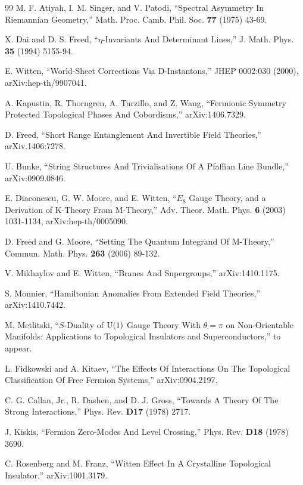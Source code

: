 \begin{thebibliography}{99}
M. F. Atiyah, I. M. Singer, and V. Patodi, ``Spectral Asymmetry In Riemannian Geometry,'' Math. Proc. Camb. Phil. Soc. {\bf{77} } (1975) 43-69.

X. Dai and D. S. Freed, ``$\eta$-Invariants And Determinant Lines,'' J. Math. Phys. {\bf 35} (1994) 5155-94.

E. Witten, ``World-Sheet Corrections Via D-Instantons,'' JHEP 0002:030 (2000), arXiv:hep-th/9907041.

A. Kapustin, R. Thorngren, A. Turzillo, and Z. Wang, ``Fermionic Symmetry Protected Topological Phases And Cobordisms,''
arXiv:1406.7329.

D. Freed, ``Short Range Entanglement And Invertible Field Theories,'' arXiv.1406:7278.

U. Bunke, ``String Structures And Trivialisations Of A Pfaffian Line Bundle,''  arXiv:0909.0846.

E. Diaconescu, G. W. Moore, and E. Witten, ``$E_8$ Gauge Theory, and a Derivation of K-Theory From M-Theory,'' 
Adv. Theor. Math. Phys. {\bf 6} (2003) 1031-1134,
arXiv:hep-th/0005090.

D. Freed and G. Moore, ``Setting The Quantum Integrand Of M-Theory,'' Commun. Math. Phys. {\bf 263} (2006) 89-132.

V. Mikhaylov and E. Witten, ``Branes And Supergroups,'' arXiv:1410.1175.

S. Monnier, ``Hamiltonian Anomalies From Extended Field Theories,'' arXiv:1410.7442.

M. Metlitski, ``$S$-Duality of  ${\mathrm U}(1)$ Gauge Theory With $\theta=\pi$ on Non-Orientable
Manifolds: Applications to Topological Insulators and
Superconductors,'' to appear.

L. Fidkowski and A. Kitaev, ``The Effects Of Interactions On The Topological Classification Of Free Fermion Systems,''
arXiv:0904.2197.




 C. G. Callan, Jr., R. Dashen, and D. J. Gross, ``Towards A Theory Of The Strong Interactions,'' Phys. Rev. {\bf D17}
(1978) 2717.

J. Kiskis, ``Fermion Zero-Modes And Level Crossing,'' Phys. Rev. {\bf D18} (1978) 3690.



C. Rosenberg and M. Franz, ``Witten Effect In A Crystalline Topological Insulator,''
arXiv:1001.3179.


\end{thebibliography}
